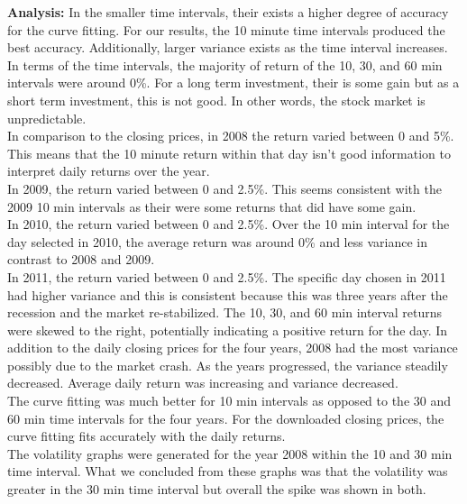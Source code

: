 \documentclass[12pt]{article}
\begin{document}
\begin{enumerate}
\newpage
\textbf{Analysis:} In the smaller time intervals, their exists a higher degree of accuracy for the curve fitting. For our results, the 10 minute time intervals produced the best accuracy. Additionally, larger variance exists as the time interval increases. In terms of the time intervals, the majority of return of the 10, 30, and 60 min intervals were around 0\%. For a long term investment, their is some gain but as a short term investment, this is not good. In other words, the stock market is unpredictable. 
\\In comparison to the closing prices, in 2008 the return varied between 0 and 5\%. This means that the 10 minute return within that day isn't good information to interpret daily returns over the year.
\\In 2009, the return varied between 0 and 2.5\%. This seems consistent with the 2009 10 min intervals as their were some returns that did have some gain.
\\In 2010, the return varied between 0 and 2.5\%. Over the 10 min interval for the day selected in 2010, the average return was around 0\% and less variance in contrast to 2008 and 2009.
\\In 2011, the return varied between 0 and 2.5\%. The specific day chosen in 2011 had higher variance and this is consistent because this was three years after the recession and the market re-stabilized. The 10, 30, and 60 min interval returns were skewed to the right, potentially indicating a positive return for the day.
In addition to the daily closing prices for the four years, 2008 had the most variance possibly due to the market crash. As the years progressed, the variance steadily decreased. Average daily return was increasing and variance decreased. 
\\The curve fitting was much better for 10 min intervals as opposed to the 30 and 60 min time intervals for the four years. For the downloaded closing prices, the curve fitting fits accurately with the daily returns. 
\\The volatility graphs were generated for the year 2008 within the 10 and 30 min time interval. What we concluded from these graphs was that the volatility was greater in the 30 min time interval but overall the spike was shown in both.

\end{enumerate}
\end{document}
